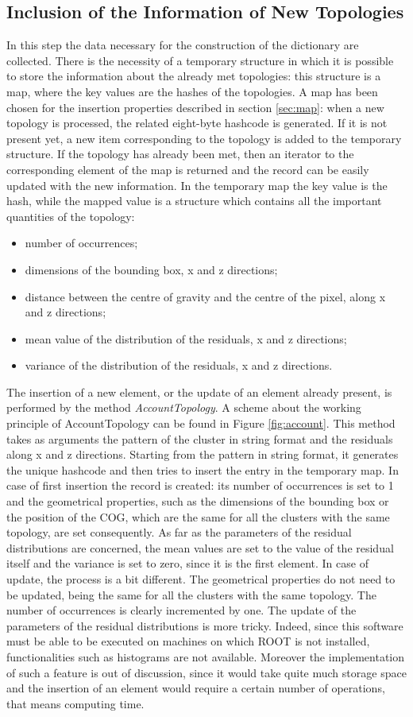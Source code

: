 \subsection{Inclusion of the Information of New Topologies}
In this step the data necessary for the construction of the dictionary are collected. There is the necessity of a temporary structure in which it is possible to store the information about the already met topologies: this structure is a map, where the key values are the hashes of the topologies.  A map has been chosen for the insertion properties described in section \ref{sec:map}: when a new topology is processed, the related eight-byte hashcode is generated. If it is not present yet, a new item corresponding to the topology is added to the temporary structure. If the topology has already been met, then an iterator to the corresponding element of the map is returned and the record can be easily updated with the new information. In the temporary map the key value is the hash, while the mapped value is a structure which contains all the important quantities of the topology:
\begin{itemize}
 \item number of occurrences;
 \item dimensions of the bounding box, x and z directions;
 \item distance between the centre of gravity and the centre of the pixel, along x and z directions;
 \item mean value of the distribution of the residuals, x and z directions;
 \item variance of the distribution of the residuals, x and z directions.
\end{itemize}
The insertion of a new element, or the update of an element already present, is performed by the method \textit{AccountTopology}. A scheme about the working principle of AccountTopology can be found in Figure \ref{fig:account}. This method takes as arguments the pattern of the cluster in string format and the residuals along x and z directions. Starting from the pattern in string format, it  generates the unique hashcode and then tries to insert the entry in the temporary map. In case of first insertion the record is created: its number of occurrences is set to 1 and the geometrical properties, such as the dimensions of the bounding box or the position of the COG, which are the same for all the clusters with the same topology, are set consequently. As far as the parameters of the residual distributions are concerned, the mean values are set to the value of the residual itself and the variance is set to zero, since it is the first element. In case of update, the process is a bit different. The geometrical properties do not need to be updated, being the same for all the clusters with the same topology. The number of occurrences is clearly incremented by one. The update of the parameters of the residual distributions is more tricky. Indeed, since this software must be able to be executed on machines on which ROOT is not installed, functionalities such as histograms are not available. Moreover the implementation of such a feature is out of discussion, since it would take quite much storage space and the insertion of an element would require a certain number of operations, that means computing time.
